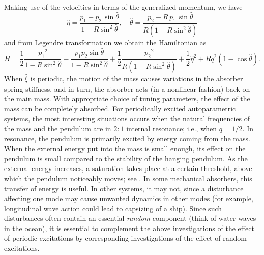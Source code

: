 Making use of the velocities in terms of the generalized momentum, we
have
\begin{equation}
\label{E:velocity}
\dot {\hat \eta} = \frac {p_1 - p_2\,\sin \hat{\theta} }{1-R \sin^2 \hat{\theta} },\quad \dot {\hat \theta} = \frac {p_2- R \, p_1\,\sin \hat{\theta} }{R\left(1- R \sin^2 \hat{\theta} \right)}
\end{equation}
and from Legendre transformation we obtain the Hamiltonian as
\[
H = \frac12 \frac{{p_1}^2}{1 - R \sin^2 \hat{\theta}} - \frac{p_1 p_2 \sin \hat{\theta}}{1- R \sin^2\hat{\theta}} + \frac12 \frac{{p_2}^2}{R (1 - R \sin^2\hat{\theta})} + \frac12 \hat{\eta}^2 + R q^2 (1 - \cos\hat{\theta}).
\]
When $\hat\xi$ is periodic, the motion of the mass causes variations in the absorber spring stiffness, and in turn, the absorber acts (in a nonlinear fashion) back on the main mass. With appropriate choice of tuning parameters, the effect of the mass can be completely absorbed. For periodically excited autoparametric systems, the most interesting situations occurs when the natural frequencies of the mass and the pendulum are in $2:1$ internal resonance; i.e., when $q = 1/2$. In resonance, the pendulum is primarily excited by energy coming from the mass. When the external energy put into the mass is small enough, its effect on the pendulum is small compared to the stability of the hanging pendulum. As the external energy increases, a saturation takes place at a certain threshold, above which the pendulum noticeably moves; see \citep{nayfeh79:_nonlin_oscil}. In some mechanical absorbers, this transfer of energy is useful. In other systems, it may not, since a disturbance affecting one mode may cause unwanted dynamics in other modes (for example, longitudinal wave action could lead to capsizing of a ship). Since such disturbances often contain an essential \emph{random} component (think of water waves in the ocean), it is essential to complement the above investigations of the effect of periodic excitations by corresponding investigations of the effect of random excitations.

